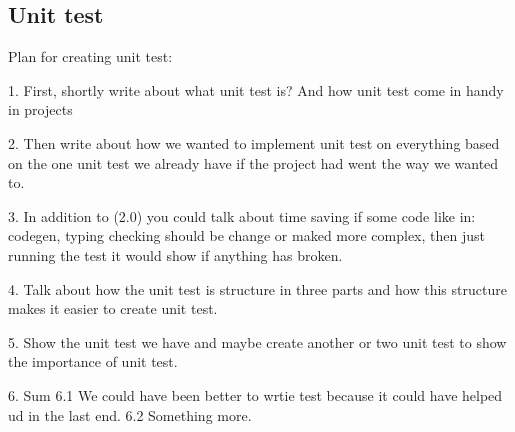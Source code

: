\subsection{Unit test}\label{subsec:unittest}

Plan for creating unit test:

1. First, shortly write about what unit test is? And how unit test come in handy in projects

2. Then write about how we wanted to implement unit test on everything based on the one unit test we already have if the project had went the way we wanted to.

3. In addition to (2.0) you could talk about time saving if some code like in: codegen, typing checking should be change or maked more complex, then just running the test it would show if anything has broken.

4. Talk about how the unit test is structure in three parts and how this structure makes it easier to create unit test.

5. Show the unit test we have and maybe create another or two unit test to show the importance of unit test.

6. Sum
    6.1 We could have been better to wrtie test because it could have helped ud in the last end.
    6.2 Something more.